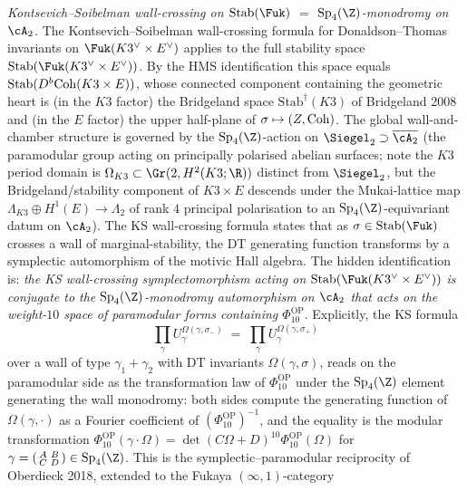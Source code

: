 \begin{remark}
\emph{Kontsevich--Soibelman wall-crossing on
$\mathrm{Stab}(\Fuk)$ $=$ $\mathrm{Sp}_4(\Z)$-monodromy on
$\cA_2$.} The Kontsevich--Soibelman wall-crossing formula for
Donaldson--Thomas invariants on $\Fuk(K3^\vee\times E^\vee)$ applies
to the full stability space $\mathrm{Stab}(\Fuk(K3^\vee\times E^\vee))$.
By the HMS identification this space equals
$\mathrm{Stab}(D^b\mathrm{Coh}(K3\times E))$, whose connected component
containing the geometric heart is (in the $K3$ factor) the
Bridgeland space $\mathrm{Stab}^\dagger(K3)$ of
Bridgeland 2008 and (in the $E$ factor) the
upper half-plane of $\sigma\mapsto(Z,\mathrm{Coh})$. The global wall-and-chamber
structure is governed by the
$\mathrm{Sp}_4(\Z)$-action on $\Siegel_2\supset\overline{\cA_2}$
\textup{(}the paramodular group acting on principally polarised
abelian surfaces; note the $K3$ period domain is
$\Omega_{K3}\subset\Gr(2,H^2(K3;\R))$ distinct from $\Siegel_2$,
but the Bridgeland/stability component of $K3\times E$ descends under
the Mukai-lattice map $\Lambda_{K3}\oplus H^1(E)\to\Lambda_2$
of rank $4$ principal polarisation
to an $\mathrm{Sp}_4(\Z)$-equivariant datum on
$\cA_2$\textup{)}. The KS wall-crossing formula states that as
$\sigma\in\mathrm{Stab}(\Fuk)$ crosses a wall of
marginal-stability, the DT generating function transforms by a
symplectic automorphism of the motivic Hall algebra. The hidden
identification is: \emph{the KS wall-crossing symplectomorphism
acting on $\mathrm{Stab}(\Fuk(K3^\vee\times E^\vee))$ is
conjugate to the $\mathrm{Sp}_4(\Z)$-monodromy automorphism on
$\cA_2$ that acts on the weight-$10$ space of paramodular forms
containing \(\Phi_{10}^{\mathrm{OP}}\)}. Explicitly, the KS formula
\[
 \prod_\gamma U_\gamma^{\Omega(\gamma,\sigma_-)}
 \;=\;
 \prod_\gamma U_\gamma^{\Omega(\gamma,\sigma_+)}
\]
over a wall of type $\gamma_1+\gamma_2$ with DT invariants
$\Omega(\gamma,\sigma)$, reads on the paramodular side as the
transformation law of \(\Phi_{10}^{\mathrm{OP}}\) under the $\mathrm{Sp}_4(\Z)$
element generating the wall monodromy: both sides compute the
generating function of $\Omega(\gamma,\cdot)$ as a Fourier
coefficient of \((\Phi_{10}^{\mathrm{OP}})^{-1}\), and the equality is the modular
transformation \(\Phi_{10}^{\mathrm{OP}}(\gamma\cdot\Omega)=
\det(C\Omega+D)^{10}\Phi_{10}^{\mathrm{OP}}(\Omega)\) for
$\gamma=\left(\begin{smallmatrix}A&B\\ C&D\end{smallmatrix}\right)\in
\mathrm{Sp}_4(\Z)$. This is the symplectic--paramodular reciprocity
of Oberdieck 2018, extended to the Fukaya $(\infty,1)$-category

\end{remark}
